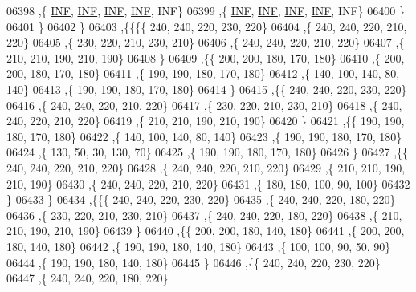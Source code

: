 \begin{DoxyCode}
06398     ,\{   \hyperlink{energy__const_8h_a12c2040f25d8e3a7b9e1c2024c618cb6}{INF},   \hyperlink{energy__const_8h_a12c2040f25d8e3a7b9e1c2024c618cb6}{INF},   \hyperlink{energy__const_8h_a12c2040f25d8e3a7b9e1c2024c618cb6}{INF},   \hyperlink{energy__const_8h_a12c2040f25d8e3a7b9e1c2024c618cb6}{INF},   INF\}
06399     ,\{   \hyperlink{energy__const_8h_a12c2040f25d8e3a7b9e1c2024c618cb6}{INF},   \hyperlink{energy__const_8h_a12c2040f25d8e3a7b9e1c2024c618cb6}{INF},   \hyperlink{energy__const_8h_a12c2040f25d8e3a7b9e1c2024c618cb6}{INF},   \hyperlink{energy__const_8h_a12c2040f25d8e3a7b9e1c2024c618cb6}{INF},   INF\}
06400     \}
06401    \}
06402   \}
06403  ,\{\{\{\{   240,   240,   220,   230,   220\}
06404     ,\{   240,   240,   220,   210,   220\}
06405     ,\{   230,   220,   210,   230,   210\}
06406     ,\{   240,   240,   220,   210,   220\}
06407     ,\{   210,   210,   190,   210,   190\}
06408     \}
06409    ,\{\{   200,   200,   180,   170,   180\}
06410     ,\{   200,   200,   180,   170,   180\}
06411     ,\{   190,   190,   180,   170,   180\}
06412     ,\{   140,   100,   140,    80,   140\}
06413     ,\{   190,   190,   180,   170,   180\}
06414     \}
06415    ,\{\{   240,   240,   220,   230,   220\}
06416     ,\{   240,   240,   220,   210,   220\}
06417     ,\{   230,   220,   210,   230,   210\}
06418     ,\{   240,   240,   220,   210,   220\}
06419     ,\{   210,   210,   190,   210,   190\}
06420     \}
06421    ,\{\{   190,   190,   180,   170,   180\}
06422     ,\{   140,   100,   140,    80,   140\}
06423     ,\{   190,   190,   180,   170,   180\}
06424     ,\{   130,    50,    30,   130,    70\}
06425     ,\{   190,   190,   180,   170,   180\}
06426     \}
06427    ,\{\{   240,   240,   220,   210,   220\}
06428     ,\{   240,   240,   220,   210,   220\}
06429     ,\{   210,   210,   190,   210,   190\}
06430     ,\{   240,   240,   220,   210,   220\}
06431     ,\{   180,   180,   100,    90,   100\}
06432     \}
06433    \}
06434   ,\{\{\{   240,   240,   220,   230,   220\}
06435     ,\{   240,   240,   220,   180,   220\}
06436     ,\{   230,   220,   210,   230,   210\}
06437     ,\{   240,   240,   220,   180,   220\}
06438     ,\{   210,   210,   190,   210,   190\}
06439     \}
06440    ,\{\{   200,   200,   180,   140,   180\}
06441     ,\{   200,   200,   180,   140,   180\}
06442     ,\{   190,   190,   180,   140,   180\}
06443     ,\{   100,   100,    90,    50,    90\}
06444     ,\{   190,   190,   180,   140,   180\}
06445     \}
06446    ,\{\{   240,   240,   220,   230,   220\}
06447     ,\{   240,   240,   220,   180,   220\}

\end{DoxyCode}
